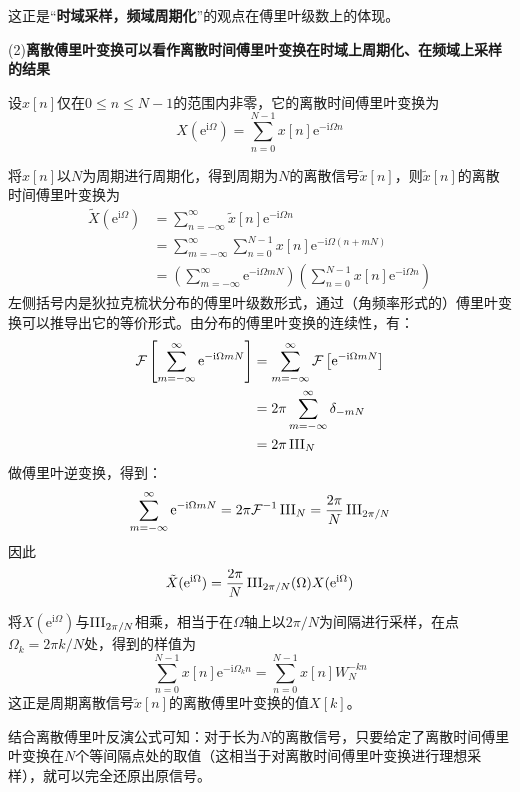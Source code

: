 这正是“\textbf{时域采样，频域周期化}”的观点在傅里叶级数上的体现。

(2)\textbf{离散傅里叶变换可以看作离散时间傅里叶变换在时域上周期化、在频域上采样的结果}

设$x[n]$仅在$0\leq n\leq N-1$的范围内非零，它的离散时间傅里叶变换为
\[X(\mathrm{e}^{\mathrm{i}\Omega})=\sum_{n=0}^{N-1}x[n]\mathrm{e}^{-\mathrm{i}\Omega n}\]

将$x[n]$以$N$为周期进行周期化，得到周期为$N$的离散信号$\tilde{x}[n]$，则$\tilde{x}[n]$的离散时间傅里叶变换为
\begin{align*}
    \tilde{X}(\mathrm{e}^{\mathrm{i}\Omega})&=\sum_{n=-\infty}^{\infty}\tilde{x}[n]\mathrm{e}^{-\mathrm{i}\Omega n}\\
    &=\sum_{m=-\infty}^{\infty}\sum_{n=0}^{N-1}x[n]\mathrm{e}^{-\mathrm{i}\Omega (n+mN)}\\
    &=\left(\sum_{m=-\infty}^{\infty}\mathrm{e}^{-\mathrm{i}\Omega mN}\right)\left(\sum_{n=0}^{N-1}x[n]\mathrm{e}^{-\mathrm{i}\Omega n}\right)
\end{align*}
左侧括号内是狄拉克梳状分布的傅里叶级数形式，通过（角频率形式的）傅里叶变换可以推导出它的等价形式。由分布的傅里叶变换的连续性，有：
\begin{align*}
    \mathcal{F}\left[\sum_{m=-\infty}^{\infty}\mathrm{e}^{-\mathrm{i}\Omega mN}\right]&=\sum_{m=-\infty}^{\infty}\mathcal{F}\left[\mathrm{e}^{-\mathrm{i}\Omega mN}\right]\\
    &=2\pi\sum_{m=-\infty}^{\infty}\delta_{-mN}\\
    &=2\pi\operatorname{III}_{N}
\end{align*}
做傅里叶逆变换，得到：\begin{align*}
    \sum_{m=-\infty}^{\infty}\mathrm{e}^{-\mathrm{i}\Omega mN}=2\pi\mathcal{F}^{-1}\operatorname{III}_{N}=\frac{2\pi}{N}\operatorname{III}_{2\pi/N}
\end{align*}
因此\begin{align*}
    \tilde{X}(\mathrm{e}^{\mathrm{i}\Omega})=\frac{2\pi}{N}\operatorname{III}_{2\pi/N}(\Omega)X(\mathrm{e}^{\mathrm{i}\Omega})
\end{align*}

将$X(\mathrm{e}^{\mathrm{i}\Omega})$与$\operatorname{III}_{2\pi/N}$相乘，相当于在$\Omega$轴上以$2\pi/N$为间隔进行采样，在点$\Omega_k=2\pi k/N$处，得到的样值为
$$\sum_{n=0}^{N-1}x[n]\mathrm{e}^{-\mathrm{i}\Omega_k n}=\sum_{n=0}^{N-1}x[n]W_N^{-kn}$$
这正是周期离散信号$\tilde{x}[n]$的离散傅里叶变换的值$X[k]$。

结合离散傅里叶反演公式可知：对于长为$N$的离散信号，只要给定了离散时间傅里叶变换在$N$个等间隔点处的取值（这相当于对离散时间傅里叶变换进行理想采样），就可以完全还原出原信号。

